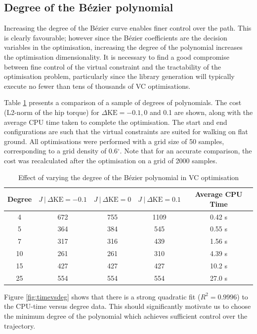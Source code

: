 \subsection{Degree of the Bézier polynomial}
Increasing the degree of the Bézier curve enables finer control over the path. This is clearly favourable; however since the Bézier coefficients are the decision variables in the optimisation, increasing the degree of the polynomial increases the optimisation dimensionality. It is necessary to find a good compromise between fine control of the virtual constraint and the tractability of the optimisation problem, particularly since the library generation will typically execute no fewer than tens of thousands of VC optimisations.

Table \ref{tab:degpol} presents a comparison of a sample of degrees of polynomials. The cost (L2-norm of the hip torque) for $\Delta\mathrm{KE}=-0.1,0$ and 0.1 are shown, along with the average CPU time taken to complete the optimisation. The start and end configurations are such that the virtual constraints are suited for walking on flat ground. All optimisations were performed with a grid size of 50 samples, corresponding to a grid density of 0.6$^\circ$. Note that for an accurate comparison, the cost was recalculated after the optimisation on a grid of 2000 samples.

\begin{table}
	\centering
	\begin{tabular}{c || c | c |c || c}
		Degree & $J~|~{\Delta\mathrm{KE}=-0.1}$ & $J~|~{\Delta\mathrm{KE}=0}$ & $J~|~{\Delta\mathrm{KE}=0.1}$ & Average CPU Time \\ \hline
		4  & 672 & 755 & 1109 & 0.42 s \\
		5  & 364 & 384 & 545  & 0.55 s \\
		7  & 317 & 316 & 439  & 1.56 s \\
		10 & 261 & 261 & 310  & 4.39 s \\
		15 & 427 & 427 & 427  & 10.2 s \\
		25 & 554 & 554 & 554  & 27.0 s
	\end{tabular}
	\caption{Effect of varying the degree of the Bézier polynomial in VC optimisation}
	\label{tab:degpol}
\end{table}

Figure \ref{fig:timevsdeg} shows that there is a strong quadratic fit ($R^2=0.9996$) to the CPU-time versus degree data. This should significantly motivate us to choose the minimum degree of the polynomial which achieves sufficient control over the trajectory.

